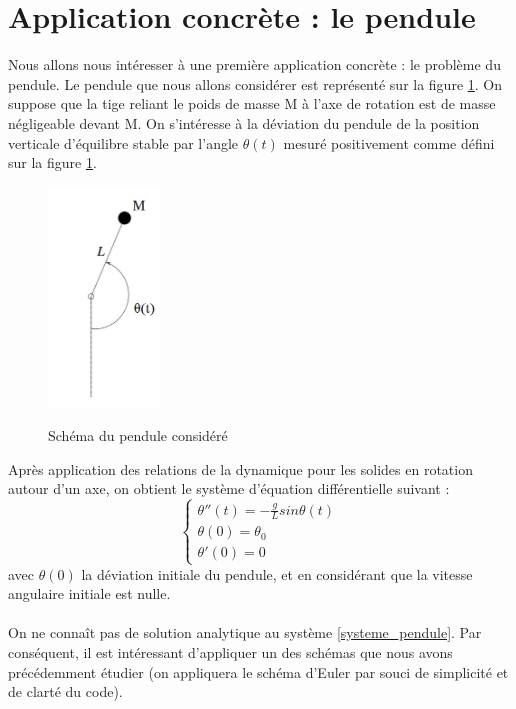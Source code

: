 \documentclass[a4paper,10pt]{report}
\begin{document}
\section{Application concrète : le pendule}
Nous allons nous intéresser à une première application concrète : le problème du pendule. Le pendule que nous allons considérer est représenté sur la figure \ref{schema_pendule}. On suppose que la tige reliant le poids de masse M à l'axe de rotation est de masse négligeable devant M. On s'intéresse à la déviation du pendule de la position verticale d'équilibre stable par l'angle $\theta(t)$ mesuré positivement comme défini sur la figure \ref{schema_pendule}.
\begin{figure}[H]
\centering
\caption{Schéma du pendule considéré}
\includegraphics[width=3cm]{pendule.jpg}
\label{schema_pendule}
\end{figure}
Après application des relations de la dynamique pour les solides en rotation autour d'un axe, on obtient le système d'équation différentielle suivant :
\begin{equation}
\label{systeme_pendule}
\left\lbrace
\begin{array}{l}
\theta''(t)= -\frac{g}{L}sin\theta (t)  \\
\theta(0)=\theta_0 \\
\theta'(0)=0
\end{array}\right.
\end{equation}
avec $\theta(0)$ la déviation initiale du pendule, et en considérant que la vitesse angulaire initiale est nulle.\\ \\

On ne connaît pas de solution analytique au système \ref{systeme_pendule}. Par conséquent, il est intéressant d'appliquer un des schémas que nous avons précédemment étudier (on appliquera le schéma d'Euler par souci de simplicité et de clarté du code). \\ \\
\end{document}
